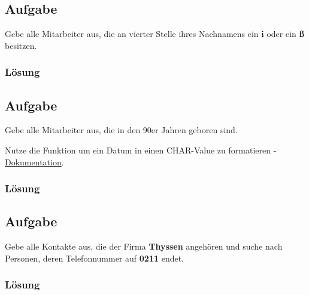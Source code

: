 \subsection{Aufgabe}
\label{sec:uebung_01.aufgabe_05}
Gebe alle Mitarbeiter aus, die an vierter Stelle ihres Nachnamens ein \textbf{i} oder ein \textbf{ß} besitzen.

\subsubsection*{Lösung}
\label{sec:uebung_01.aufgabe_05.loesung}

\subsection{Aufgabe}
\label{sec:uebung_01.aufgabe_06}
Gebe alle Mitarbeiter aus, die in den 90er Jahren geboren sind.

\begin{info-popup}
  Nutze die Funktion  um ein Datum in einen CHAR-Value zu formatieren - \href{https://docs.oracle.com/cd/B19306_01/server.102/b14200/functions180.htm}{Dokumentation}.

\end{info-popup}

\subsubsection*{Lösung}
\label{sec:uebung_01.aufgabe_06.loesung}

\subsection{Aufgabe}
\label{sec:uebung_01.aufgabe_07}
Gebe alle Kontakte aus, die der Firma \textbf{Thyssen} angehören und suche nach Personen, deren Telefonnummer auf \textbf{0211} endet.

\subsubsection*{Lösung}
\label{sec:uebung_01.aufgabe_07.loesung}

